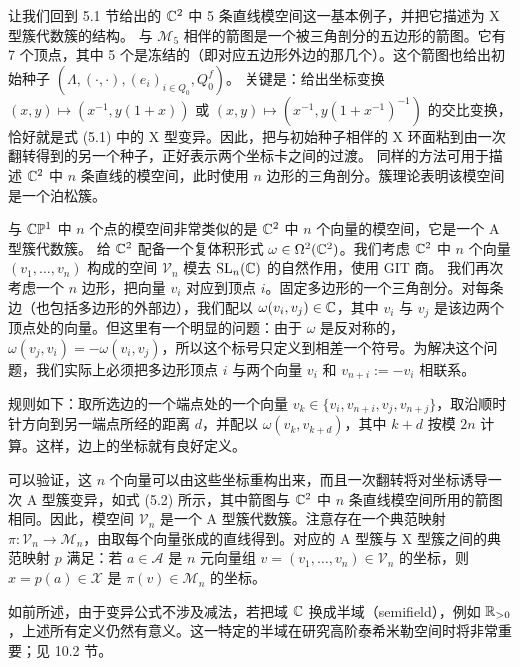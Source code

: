 \begin{example}[5.13]
让我们回到 5.1 节给出的 $\mathbb{C}^2$ 中 5 条直线模空间这一基本例子，并把它描述为 X 型簇代数簇的结构。
与 $\mathcal{M}_5$ 相伴的箭图是一个被三角剖分的五边形的箭图。它有 7 个顶点，其中 5 个是冻结的（即对应五边形外边的那几个）。这个箭图也给出初始种子 $(\Lambda,(\cdot,\cdot),(e_i)_{i\in Q_0},Q_0^f)$。
关键是：给出坐标变换 $(x,y)\mapsto(x^{-1},y(1+x))$ 或 $(x,y)\mapsto(x^{-1},y(1+x^{-1})^{-1})$ 的交比变换，恰好就是式 (5.1) 中的 X 型变异。因此，把与初始种子相伴的 X 环面粘到由一次翻转得到的另一个种子，正好表示两个坐标卡之间的过渡。
同样的方法可用于描述 $\mathbb{C}^2$ 中 $n$ 条直线的模空间，此时使用 $n$ 边形的三角剖分。簇理论表明该模空间是一个泊松簇。
\end{example}

\begin{example}[5.14]
与 $\mathbb{C}\mathbb{P}^1$ 中 $n$ 个点的模空间非常类似的是 $\mathbb{C}^2$ 中 $n$ 个向量的模空间，它是一个 A 型簇代数簇。
给 $\mathbb{C}^2$ 配备一个复体积形式 $\omega\in\Omega^2(\mathbb{C}^2)$。我们考虑 $\mathbb{C}^2$ 中 $n$ 个向量 $(v_1,\dots,v_n)$ 构成的空间 $\mathcal{V}_n$ 模去 $\operatorname{SL}_n(\mathbb{C})$ 的自然作用，使用 GIT 商。
我们再次考虑一个 $n$ 边形，把向量 $v_i$ 对应到顶点 $i$。固定多边形的一个三角剖分。对每条边（也包括多边形的外部边），我们配以 $\omega(v_i,v_j)\in\mathbb{C}$，其中 $v_i$ 与 $v_j$ 是该边两个顶点处的向量。但这里有一个明显的问题：由于 $\omega$ 是反对称的，$\omega(v_j,v_i)=-\omega(v_i,v_j)$，所以这个标号只定义到相差一个符号。为解决这个问题，我们实际上必须把多边形顶点 $i$ 与两个向量 $v_i$ 和 $v_{n+i}:=-v_i$ 相联系。
\end{example}

规则如下：取所选边的一个端点处的一个向量 $v_k\in\{v_i,v_{n+i},v_j,v_{n+j}\}$，取沿顺时针方向到另一端点所经的距离 $d$，并配以 $\omega(v_k,v_{k+d})$，其中 $k+d$ 按模 $2n$ 计算。这样，边上的坐标就有良好定义。

可以验证，这 $n$ 个向量可以由这些坐标重构出来，而且一次翻转将对坐标诱导一次 A 型簇变异，如式 (5.2) 所示，其中箭图与 $\mathbb{C}^2$ 中 $n$ 条直线模空间所用的箭图相同。因此，模空间 $\mathcal{V}_n$ 是一个 A 型簇代数簇。注意存在一个典范映射 $\pi:\mathcal{V}_n\to\mathcal{M}_n$，由取每个向量张成的直线得到。对应的 A 型簇与 X 型簇之间的典范映射 $p$ 满足：若 $a\in\mathcal{A}$ 是 $n$ 元向量组 $v=(v_1,\dots,v_n)\in\mathcal{V}_n$ 的坐标，则 $x=p(a)\in\mathcal{X}$ 是 $\pi(v)\in\mathcal{M}_n$ 的坐标。

如前所述，由于变异公式不涉及减法，若把域 $\mathbb{C}$ 换成半域（semifield），例如 $\mathbb{R}_{>0}$，上述所有定义仍然有意义。这一特定的半域在研究高阶泰希米勒空间时将非常重要；见 10.2 节。

